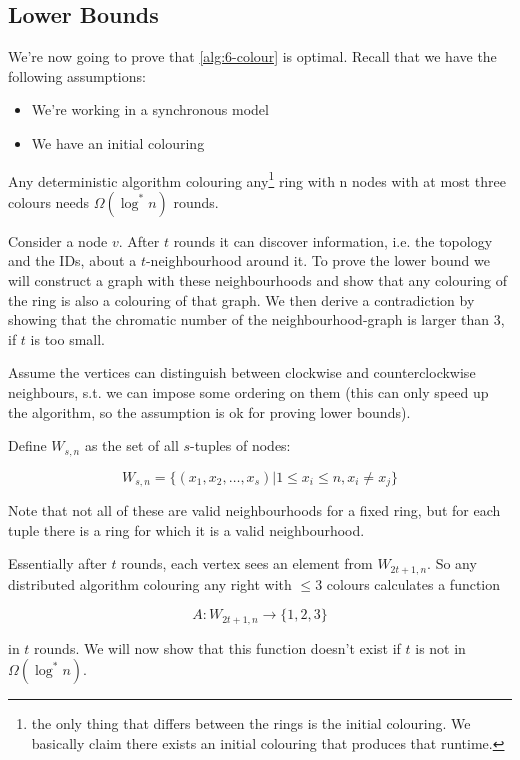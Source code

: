 \subsection{Lower Bounds}

We're now going to prove that \ref{alg:6-colour} is optimal. Recall that we have the following assumptions:

\begin{itemize}
\item We're working in a synchronous model
\item We have an initial colouring
\end{itemize}

\begin{thm}\label{thm:ring_colour_lowerbound} Any deterministic algorithm colouring any\footnote{the only thing that differs between the rings is the initial colouring. We basically claim there exists an initial colouring that produces that runtime.} ring with n nodes with at most three colours needs $\Omega(\log^* n)$ rounds.
\end{thm}

Consider a node $v$. After $t$ rounds it can discover information, i.e. the topology and the IDs, about a $t$-neighbourhood around it. To prove the lower bound we will construct a graph with these neighbourhoods and show that any colouring of the ring is also a colouring of that graph. We then derive a contradiction by showing that the chromatic number of the neighbourhood-graph is larger than 3, if $t$ is too small.

Assume the vertices can distinguish between clockwise and counterclockwise neighbours, s.t. we can impose some ordering on them (this can only speed up the algorithm, so the assumption is ok for proving lower bounds).

Define $W_{s,n}$ as the set of all $s$-tuples of nodes:

\[W_{s,n} = \{(x_1,x_2,\ldots,x_s) | 1 \leq x_i\leq n, x_i\neq x_j\}\]

Note that not all of these are valid neighbourhoods for a fixed ring, but for each tuple there is a ring for which it is a valid neighbourhood.

Essentially after $t$ rounds, each vertex sees an element from $W_{2t+1,n}$. So any distributed algorithm colouring any right with $\leq 3$ colours calculates a function

\[A:W_{2t+1,n} \longrightarrow \{1,2,3\}\]

in $t$ rounds. We will now show that this function doesn't exist if $t$ is not in $\Omega(\log^*n)$.

